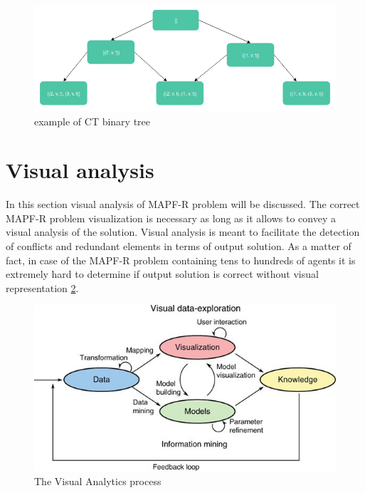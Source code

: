 \documentclass[thesis=B,english]{FITthesis}[2019/12/23]
\begin{document}
\begin{figure}\centering
	\includegraphics[scale=0.5]{binary_CT.png}
	\caption[example of CT binary tree]{example of CT binary tree}\label{fig:float1}
\end{figure}

\section{Visual analysis}

In this section visual analysis of MAPF-R problem will be discussed. The correct MAPF-R problem visualization is necessary as long as it allows to convey a visual analysis of the solution. Visual analysis is meant to facilitate the detection of conflicts and redundant elements in terms of output solution. As a matter of fact, in case of the MAPF-R problem containing tens to hundreds of agents it is extremely hard to determine if output solution is correct without visual representation \ref{fig:float2}.

\begin{figure}\centering
	\includegraphics[scale=0.5]{model1.jpg}
	\caption[The Visual Analytics process]{The Visual Analytics process}\label{fig:float2}
\end{figure}
\end{document}
